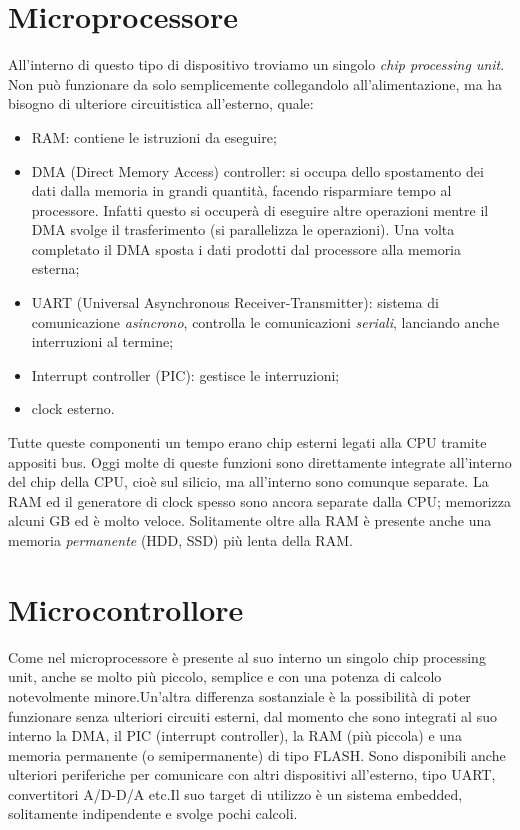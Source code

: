 \documentclass[
]{book}
\providecommand{\tightlist}{%
  \setlength{\itemsep}{0pt}\setlength{\parskip}{0pt}}
\begin{document}
\section{Microprocessore}\label{microprocessore}

All'interno di questo tipo di dispositivo troviamo un singolo \emph{chip
processing unit}. Non può funzionare da solo semplicemente collegandolo
all'alimentazione, ma ha bisogno di ulteriore circuitistica all'esterno,
quale:

\begin{itemize}
\tightlist
\item
  RAM: contiene le istruzioni da eseguire;
\item
  DMA (Direct Memory Access) controller: si occupa dello spostamento dei
  dati dalla memoria in grandi quantità, facendo risparmiare tempo al
  processore. Infatti questo si occuperà di eseguire altre operazioni
  mentre il DMA svolge il trasferimento (si parallelizza le operazioni).
  Una volta completato il DMA sposta i dati prodotti dal processore alla
  memoria esterna;
\item
  UART (Universal Asynchronous Receiver-Transmitter): sistema di
  comunicazione \emph{asincrono}, controlla le comunicazioni
  \emph{seriali}, lanciando anche interruzioni al termine;
\item
  Interrupt controller (PIC): gestisce le interruzioni;
\item
  clock esterno.
\end{itemize}

Tutte queste componenti un tempo erano chip esterni legati alla CPU
tramite appositi bus. Oggi molte di queste funzioni sono direttamente
integrate all'interno del chip della CPU, cioè sul silicio, ma
all'interno sono comunque separate. La RAM ed il generatore di clock
spesso sono ancora separate dalla CPU; memorizza alcuni GB ed è molto
veloce. Solitamente oltre alla RAM è presente anche una memoria
\emph{permanente} (HDD, SSD) più lenta della RAM.

\section{Microcontrollore}\label{microcontrollore}

Come nel microprocessore è presente al suo interno un singolo chip
processing unit, anche se molto più piccolo, semplice e con una potenza
di calcolo notevolmente minore.\newline Un'altra differenza sostanziale
è la possibilità di poter funzionare senza ulteriori circuiti esterni,
dal momento che sono integrati al suo interno la DMA, il PIC (interrupt
controller), la RAM (più piccola) e una memoria permanente (o
semipermanente) di tipo FLASH. Sono disponibili anche ulteriori
periferiche per comunicare con altri dispositivi all'esterno, tipo UART,
convertitori A/D-D/A etc.\newline Il suo target di utilizzo è un sistema
embedded, solitamente indipendente e svolge pochi calcoli.
\end{document}
